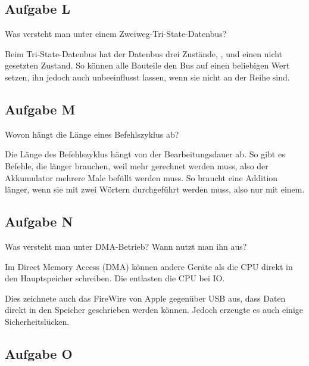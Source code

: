 \subsection{Aufgabe L}

\begin{problem}
	Was versteht man unter einem Zweiweg-Tri-State-Datenbus?
\end{problem}

Beim Tri-State-Datenbus hat der Datenbus drei Zustände, \thigh, \tlow{} und
einen nicht gesetzten Zustand. So können alle Bauteile den Bus auf einen
beliebigen Wert setzen, ihn jedoch auch unbeeinflusst lassen, wenn sie nicht an
der Reihe sind. \cite{matthes/bus_micro}

\subsection{Aufgabe M}

\begin{problem}
	Wovon hängt die Länge eines Befehlszyklus ab?
\end{problem}

Die Länge des Befehlszyklus hängt von der Bearbeitungsdauer ab. So gibt es
Befehle, die länger brauchen, weil mehr gerechnet werden muss, also der
Akkumulator mehrere Male befüllt werden muss. So braucht eine Addition länger,
wenn sie mit zwei Wörtern durchgeführt werden muss, also nur mit einem.

\subsection{Aufgabe N}

\begin{problem}
	Was versteht man unter DMA-Betrieb? Wann nutzt man ihn aus?
\end{problem}

Im Direct Memory Access (DMA) können andere Geräte als die CPU direkt in den
Hauptspeicher schreiben. Die entlasten die CPU bei IO.
\cite{glossarwiki/direct_memory_access}

Dies zeichnete auch das FireWire von Apple gegenüber USB aus, dass Daten direkt
in den Speicher geschrieben werden können. Jedoch erzeugte es auch einige
Sicherheitslücken. \cite{wikipedia/DMA_attack,herman/dma}

\subsection{Aufgabe O}

